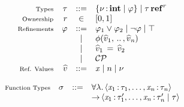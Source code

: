 
\begin{figure}[t]
  \begin{minipage}{0.2\textwidth}
  \[
    \begin{array}{rrcl}
      \text{\scriptsize Types} & \tau %
                                         &::=&  \set{  \nu  \COL \TINT \mid  \varphi }  \mid  \tau  \TREF^{ r }  \\
      \text{\scriptsize Ownership} & r & \in & [0,1] \\
      \text{\scriptsize Refinements} & \varphi & ::= & \varphi_{{\mathrm{1}}}  \vee  \varphi_{{\mathrm{2}}} \mid  \neg  \varphi  \mid  \top  \\
                               & & \mid & \phi  \ottsym{(}  \widehat{v}_{{\mathrm{1}}}  \ottsym{,} \, .. \, \ottsym{,}  \widehat{v}_{\ottmv{n}}  \ottsym{)} \\
                               & & \mid & \widehat{v}_{{\mathrm{1}}} \, \ottsym{=} \, \widehat{v}_{{\mathrm{2}}} \\
                                 & & \mid & \mathcal{CP} \\
      \text{\scriptsize Ref. Values} & \widehat{v} & ::= & \mathit{x} \mid n \mid \nu \\
    \end{array}
  \]
\end{minipage}
\hfill
\begin{minipage}{0.59\textwidth}
  \[
    \begin{array}{rrcl}
      \text{\scriptsize Function Types} & \sigma & ::= &  \forall  \lambda .\left\langle{ \mathit{x_{{\mathrm{1}}}} \operatorname{:}\tau_{{\mathrm{1}}} ,\dots, \mathit{x_{\mathit{n}}} \operatorname{:}\tau_{\mathit{n}} }\right\rangle \\ & & & \operatorname{\rightarrow}\left\langle{ \mathit{x_{{\mathrm{1}}}} \operatorname{:}\tau'_{{\mathrm{1}}} ,\dots, \mathit{x_{\mathit{n}}} \operatorname{:}\tau'_{\mathit{n}}  \mid  \tau }\right\rangle  \\

\end{array}\]
\end{minipage}
\end{figure}
